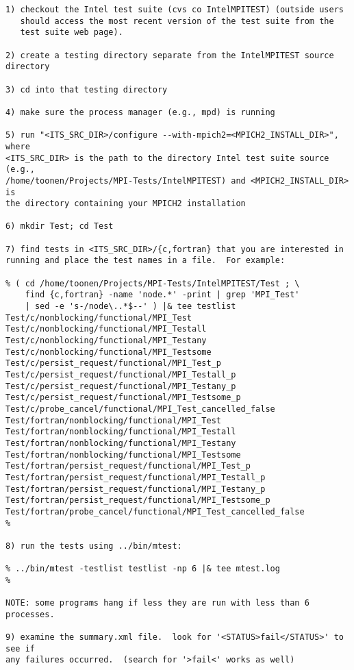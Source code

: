 \documentclass[dvipdfm,11pt]{article}
\begin{document}
\begin{small}
\begin{verbatim}
1) checkout the Intel test suite (cvs co IntelMPITEST) (outside users
   should access the most recent version of the test suite from the
   test suite web page).

2) create a testing directory separate from the IntelMPITEST source
directory

3) cd into that testing directory

4) make sure the process manager (e.g., mpd) is running

5) run "<ITS_SRC_DIR>/configure --with-mpich2=<MPICH2_INSTALL_DIR>", where
<ITS_SRC_DIR> is the path to the directory Intel test suite source (e.g.,
/home/toonen/Projects/MPI-Tests/IntelMPITEST) and <MPICH2_INSTALL_DIR> is
the directory containing your MPICH2 installation

6) mkdir Test; cd Test

7) find tests in <ITS_SRC_DIR>/{c,fortran} that you are interested in
running and place the test names in a file.  For example:

% ( cd /home/toonen/Projects/MPI-Tests/IntelMPITEST/Test ; \
    find {c,fortran} -name 'node.*' -print | grep 'MPI_Test' 
    | sed -e 's-/node\..*$--' ) |& tee testlist
Test/c/nonblocking/functional/MPI_Test
Test/c/nonblocking/functional/MPI_Testall
Test/c/nonblocking/functional/MPI_Testany
Test/c/nonblocking/functional/MPI_Testsome
Test/c/persist_request/functional/MPI_Test_p
Test/c/persist_request/functional/MPI_Testall_p
Test/c/persist_request/functional/MPI_Testany_p
Test/c/persist_request/functional/MPI_Testsome_p
Test/c/probe_cancel/functional/MPI_Test_cancelled_false
Test/fortran/nonblocking/functional/MPI_Test
Test/fortran/nonblocking/functional/MPI_Testall
Test/fortran/nonblocking/functional/MPI_Testany
Test/fortran/nonblocking/functional/MPI_Testsome
Test/fortran/persist_request/functional/MPI_Test_p
Test/fortran/persist_request/functional/MPI_Testall_p
Test/fortran/persist_request/functional/MPI_Testany_p
Test/fortran/persist_request/functional/MPI_Testsome_p
Test/fortran/probe_cancel/functional/MPI_Test_cancelled_false
%

8) run the tests using ../bin/mtest:

% ../bin/mtest -testlist testlist -np 6 |& tee mtest.log
%

NOTE: some programs hang if less they are run with less than 6 processes.

9) examine the summary.xml file.  look for '<STATUS>fail</STATUS>' to see if
any failures occurred.  (search for '>fail<' works as well)

\end{verbatim}
\end{small}
\end{document}

